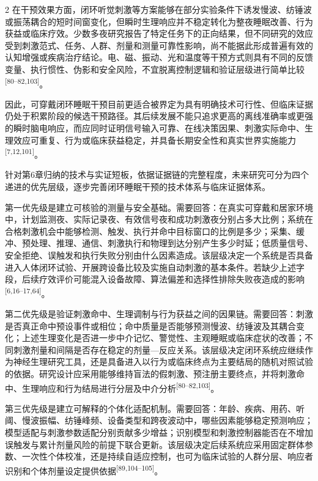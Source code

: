\documentclass[UTF8,zihao=5,fontset=none]{ctexart}
\newcommand{\hei}{\CJKfamily{hei}}
\newcommand{\leveltwo}[1]{%
  \par\noindent{\hei\fontsize{10pt}{12pt}\selectfont\bfseries #1\par}}
\newcommand{\refcite}[1]{\nolinebreak[4]\textsuperscript{[#1]}}
\begin{document}
\begin{multicols}{2}
在干预效果方面，闭环听觉刺激等方案能够在部分实验条件下诱发慢波、纺锤波或振荡耦合的短时间窗变化，但瞬时生理响应并不稳定转化为整夜睡眠改善、行为获益或临床疗效。少数多夜研究报告了特定任务下的正向结果，但不同研究的效应受到刺激范式、任务、人群、剂量和测量可靠性影响，尚不能据此形成普遍有效的认知增强或疾病治疗结论。电、磁、振动、光和温度等干预方式则具有不同的反馈变量、执行惯性、伪影和安全风险，不宜脱离控制逻辑和验证层级进行简单比较\refcite{80--82,103}。\par

因此，可穿戴闭环睡眠干预目前更适合被界定为具有明确技术可行性、但临床证据仍处于积累阶段的候选干预路径。其后续发展不能只追求更高的离线准确率或更强的瞬时脑电响应，而应同时证明信号输入可靠、在线决策因果、刺激实际命中、生理效应可重复、行为或临床获益稳定，并具备长期安全性和真实世界实施能力\refcite{7,12,101}。\par

\leveltwo{7.2 优先研究问题及决策意义}

针对第6章归纳的技术与实证短板，依据证据链的完整程度，未来研究可分为四个递进的优先层级，逐步完善闭环睡眠干预的技术体系与临床证据体系。\par

第一优先级是建立可核验的测量与安全基础。需要回答：在真实可穿戴和居家环境中，计划监测夜、实际记录夜、有效信号夜和成功刺激夜分别占多大比例；系统在合格刺激机会中能够检测、触发、执行并命中目标窗口的比例是多少；采集、缓冲、预处理、推理、通信、刺激执行和物理到达分别产生多少时延；低质量信号、安全拒绝、误触发和执行失败分别由什么因素造成。该层级决定一个系统是否具备进入人体闭环试验、开展跨设备比较及实施自动刺激的基本条件。若缺少上述字段，后续疗效评价可能混入设备故障、算法偏差和选择性排除失败夜造成的影响\refcite{6,16--17,64}。\par

第二优先级是验证刺激命中、生理调制与行为获益之间的因果链。需要回答：刺激是否真正命中预设事件或相位；命中质量是否能够预测慢波、纺锤波及其耦合变化；上述生理变化是否进一步中介记忆、警觉性、主观睡眠或临床症状的改善；不同刺激剂量和间隔是否存在稳定的剂量—反应关系。该层级决定闭环系统应继续作为神经生理研究工具，还是具备进入以行为或临床终点为主要结局的随机对照试验的依据。研究设计应采用能够维持盲法的假刺激、预注册主要终点，并将刺激命中、生理响应和行为结局进行分层及中介分析\refcite{80--82,103}。\par

第三优先级是建立可解释的个体化适配机制。需要回答：年龄、疾病、用药、听阈、慢波振幅、纺锤峰频、设备类型和跨夜波动中，哪些因素能够稳定预测响应；模型适配与刺激参数适配分别贡献多少增益；识别模型和刺激控制器能否在不增加误触发与累计剂量风险的前提下联合更新。该层级决定后续系统应采用固定群体参数、一次性个体校准，还是持续自适应控制，也可为临床试验的人群分层、响应者识别和个体剂量设定提供依据\refcite{89,104--105}。\par


\end{multicols}
\end{document}
